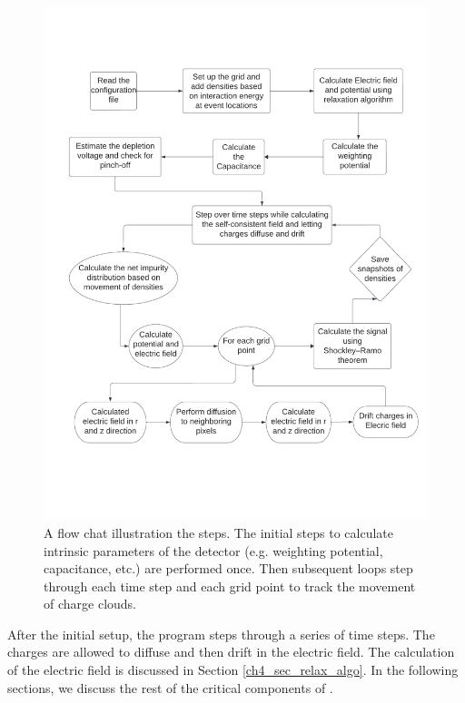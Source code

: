 \begin{figure}[!htb]
\centering
\includegraphics[width=0.99\linewidth,trim={2pc 10pc 1.5pc 9pc},clip]{ch3/figs/ehd_flowchart.pdf}
\caption{A flow chat illustration the {\ehd} steps. The initial steps to calculate intrinsic parameters of the detector (e.g. weighting potential, capacitance, etc.) are performed once. Then subsequent loops step through each time step and each grid point to track the movement of charge clouds.}
\label{fig:ehd_flowchart}
\end{figure}

After the initial setup, the program steps through a series of time steps. The charges are allowed to diffuse and then drift in the electric field. The calculation of the electric field is discussed in Section \ref{ch4_sec_relax_algo}. In the following sections, we discuss the rest of the critical components of {\ehd}.

